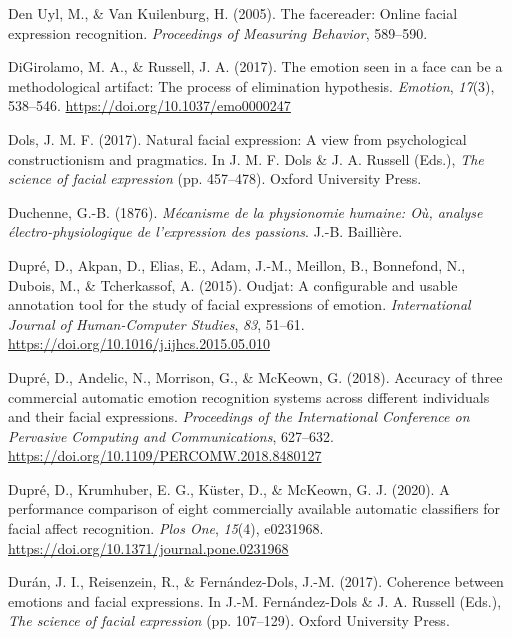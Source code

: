 \documentclass[
  english,
  doc]{apa7}
\newlength{\cslhangindent}
\newenvironment{cslreferences}%
  {\setlength{\parindent}{0pt}%
  \everypar{\setlength{\hangindent}{\cslhangindent}}\ignorespaces}%
  {\par}
\begin{document}
\begin{cslreferences}
\leavevmode\hypertarget{ref-den2005facereader}{}%
Den Uyl, M., \& Van Kuilenburg, H. (2005). The facereader: Online facial expression recognition. \emph{Proceedings of Measuring Behavior}, 589--590.

\leavevmode\hypertarget{ref-digirolamo2017emotion}{}%
DiGirolamo, M. A., \& Russell, J. A. (2017). The emotion seen in a face can be a methodological artifact: The process of elimination hypothesis. \emph{Emotion}, \emph{17}(3), 538--546. \url{https://doi.org/10.1037/emo0000247}

\leavevmode\hypertarget{ref-dols2017natural}{}%
Dols, J. M. F. (2017). Natural facial expression: A view from psychological constructionism and pragmatics. In J. M. F. Dols \& J. A. Russell (Eds.), \emph{The science of facial expression} (pp. 457--478). Oxford University Press.

\leavevmode\hypertarget{ref-duchenne1876mecanisme}{}%
Duchenne, G.-B. (1876). \emph{Mécanisme de la physionomie humaine: Où, analyse électro-physiologique de l'expression des passions}. J.-B. Baillière.

\leavevmode\hypertarget{ref-dupre2015oudjat}{}%
Dupré, D., Akpan, D., Elias, E., Adam, J.-M., Meillon, B., Bonnefond, N., Dubois, M., \& Tcherkassof, A. (2015). Oudjat: A configurable and usable annotation tool for the study of facial expressions of emotion. \emph{International Journal of Human-Computer Studies}, \emph{83}, 51--61. \url{https://doi.org/10.1016/j.ijhcs.2015.05.010}

\leavevmode\hypertarget{ref-dupre2018accuracy}{}%
Dupré, D., Andelic, N., Morrison, G., \& McKeown, G. (2018). Accuracy of three commercial automatic emotion recognition systems across different individuals and their facial expressions. \emph{Proceedings of the International Conference on Pervasive Computing and Communications}, 627--632. \url{https://doi.org/10.1109/PERCOMW.2018.8480127}

\leavevmode\hypertarget{ref-dupre2020performance}{}%
Dupré, D., Krumhuber, E. G., Küster, D., \& McKeown, G. J. (2020). A performance comparison of eight commercially available automatic classifiers for facial affect recognition. \emph{Plos One}, \emph{15}(4), e0231968. \url{https://doi.org/10.1371/journal.pone.0231968}

\leavevmode\hypertarget{ref-duran2017coherence}{}%
Durán, J. I., Reisenzein, R., \& Fernández-Dols, J.-M. (2017). Coherence between emotions and facial expressions. In J.-M. Fernández-Dols \& J. A. Russell (Eds.), \emph{The science of facial expression} (pp. 107--129). Oxford University Press.


\end{cslreferences}
\end{document}
